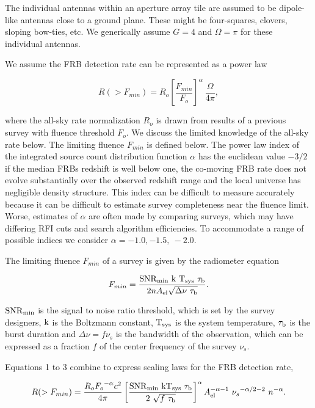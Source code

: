 \documentclass[fleqn,usenatbib]{mnras}
\begin{document}
The individual antennas within an aperture array tile are assumed to be dipole-like antennas close to a ground plane. These might be four-squares, clovers, sloping bow-ties, etc.  We generically assume $G=4$ and $\Omega = \pi$ for these individual antennas.

We assume the FRB detection rate can be represented as a power law 

\begin{equation}
	R(>F_{min}) = R_o \left[ \frac{F_{min} }{F_o} \right] ^\alpha  ~\frac{\Omega}{4 \pi}, 
\end{equation}  

where the all-sky rate normalization $R_o$ is drawn from results of a previous survey with fluence threshold $F_o $. We discuss the limited knowledge of the all-sky rate below. The limiting fluence $F_{min}$ is defined below.
The power law index of the integrated source count distribution function $\alpha $ has the euclidean value $-3/2$ if the median FRBs  redshift is well below one, the co-moving FRB rate does not evolve substantially over the observed redshift range and the local universe has negligible density structure. This index can be difficult to measure accurately because it can be difficult to estimate survey completeness near the fluence limit. Worse, estimates of $\alpha$ are often made by comparing surveys, which may have differing RFI cuts and search algorithm efficiencies.  To accommodate a range of possible indices we consider $\alpha = -1.0, -1.5, ~-2.0$. 

The limiting fluence $F_{min}$ of a survey is given by the radiometer equation 

\begin{equation}
	F_{min} =  \frac{\rm{SNR}_{\rm{min}} ~k ~T_{sys} ~\tau_b}{2 n A_{\rm{el}} \sqrt{\Delta \nu ~\tau_{\rm{b}}}} .
\end{equation}
                
$\rm{SNR}_{\rm{min}}$  is the signal to noise ratio threshold, which is set by the survey designers,
${\rm k }$ is the Boltzmann constant, ${\rm T_{sys}} $  is the system temperature, $\tau_{\rm{b}}$ is the burst duration and $\Delta \nu =f  \nu_s $ is the bandwidth of the observation, which can be expressed as a fraction $f$ of the center frequency of the survey $\nu_s $.

Equations 1 to 3  combine to express scaling laws for the FRB detection rate,

\begin{equation}
R(>F_{min}) = \frac {R_o {F_o}^{-\alpha} c^2}{4 \pi} \left[  \frac{  \rm{SNR}_{\rm{min}} ~ kT_{sys} ~\tau_b}{ 2~\sqrt{f ~ \tau_{\rm{b }} } } \right]  ^{\alpha}A_{\rm{el}} ^{-\alpha-1} ~{\nu_s}^{-\alpha/2-2} ~{n^{-\alpha}}.
\end{equation}
\end{document}
